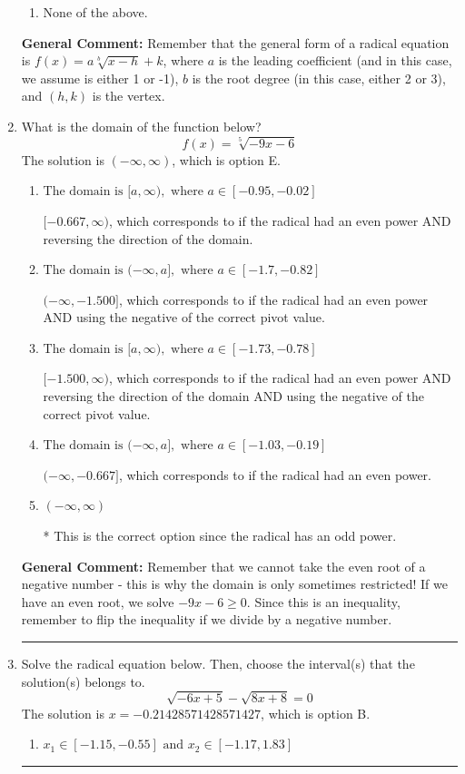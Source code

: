 \documentclass{extbook}[14pt]
\newcommand{\litem}[1]{\item #1

\rule{\textwidth}{0.4pt}}
\begin{document}
\begin{enumerate}
{\begin{enumerate}[label=\Alph*.]
\begin{multicols}{2}
\end{multicols}\item None of the above.\end{enumerate}
\textbf{General Comment:} Remember that the general form of a radical equation is $ f(x) = a \sqrt[b]{x - h} + k $, where $a$ is the leading coefficient (and in this case, we assume is either 1 or -1), $b$ is the root degree (in this case, either 2 or 3), and $(h, k)$ is the vertex.
}
\litem{
What is the domain of the function below?
\[ f(x) = \sqrt[5]{-9 x - 6} \]The solution is \( (-\infty, \infty) \), which is option E.\begin{enumerate}[label=\Alph*.]
\item \( \text{The domain is } [a, \infty), \text{   where } a \in [-0.95, -0.02] \)

$[-0.667, \infty)$, which corresponds to if the radical had an even power AND reversing the direction of the domain.
\item \( \text{The domain is } (-\infty, a], \text{   where } a \in [-1.7, -0.82] \)

$(-\infty, -1.500]$, which corresponds to if the radical had an even power AND using the negative of the correct pivot value.
\item \( \text{The domain is } [a, \infty), \text{   where } a \in [-1.73, -0.78] \)

$[-1.500, \infty)$, which corresponds to if the radical had an even power AND reversing the direction of the domain AND using the negative of the correct pivot value.
\item \( \text{The domain is } (-\infty, a], \text{   where } a \in [-1.03, -0.19] \)

$(-\infty, -0.667]$, which corresponds to if the radical had an even power.
\item \( (-\infty, \infty) \)

* This is the correct option since the radical has an odd power.
\end{enumerate}

\textbf{General Comment:} Remember that we cannot take the even root of a negative number - this is why the domain is only sometimes restricted! If we have an even root, we solve $-9 x - 6 \geq 0$. Since this is an inequality, remember to flip the inequality if we divide by a negative number.
}
\litem{
Solve the radical equation below. Then, choose the interval(s) that the solution(s) belongs to.
\[ \sqrt{-6 x + 5} - \sqrt{8 x + 8} = 0 \]The solution is \( x = -0.21428571428571427 \), which is option B.\begin{enumerate}[label=\Alph*.]
\item \( x_1 \in [-1.15, -0.55] \text{ and } x_2 \in [-1.17,1.83] \)


\end{enumerate}}
\end{enumerate}
\end{document}

